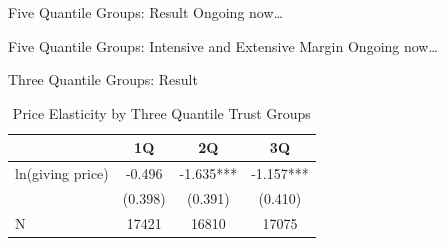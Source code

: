 \documentclass[
  ignorenonframetext,
]{beamer}
\begin{document}
\begin{frame}{Five Quantile Groups: Result}
\protect\hypertarget{five-quantile-groups-result}{}
Ongoing now\ldots{}
\end{frame}

\begin{frame}{Five Quantile Groups: Intensive and Extensive Margin}
\protect\hypertarget{five-quantile-groups-intensive-and-extensive-margin}{}
Ongoing now\ldots{}
\end{frame}

\begin{frame}{Three Quantile Groups: Result}
\protect\hypertarget{three-quantile-groups-result}{}
\begin{table}

\caption{\label{tab:kableEstimateElasticityByTrustGroup3}Price Elasticity by Three Quantile Trust Groups}
\centering
\begin{tabular}[t]{lccc}
\toprule
 & 1Q & 2Q & 3Q\\
\midrule
ln(giving price) & -0.496 & -1.635*** & -1.157***\\
 & (0.398) & (0.391) & (0.410)\\
N & 17421 & 16810 & 17075\\
\bottomrule
\end{tabular}
\end{table}
\end{frame}
\end{document}
